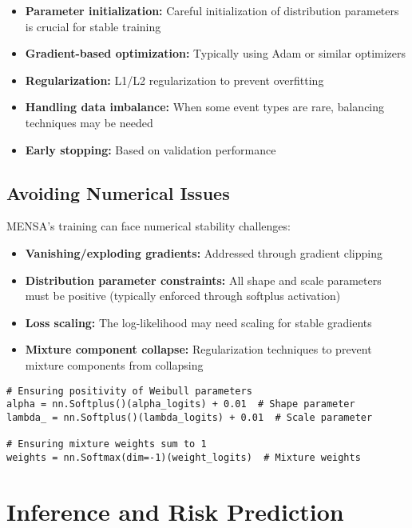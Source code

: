 \begin{itemize}
    \item \textbf{Parameter initialization:} Careful initialization of distribution parameters is crucial for stable training
    \item \textbf{Gradient-based optimization:} Typically using Adam or similar optimizers
    \item \textbf{Regularization:} L1/L2 regularization to prevent overfitting
    \item \textbf{Handling data imbalance:} When some event types are rare, balancing techniques may be needed
    \item \textbf{Early stopping:} Based on validation performance
\end{itemize}

\subsection{Avoiding Numerical Issues}

MENSA's training can face numerical stability challenges:

\begin{itemize}
    \item \textbf{Vanishing/exploding gradients:} Addressed through gradient clipping
    \item \textbf{Distribution parameter constraints:} All shape and scale parameters must be positive (typically enforced through softplus activation)
    \item \textbf{Loss scaling:} The log-likelihood may need scaling for stable gradients
    \item \textbf{Mixture component collapse:} Regularization techniques to prevent mixture components from collapsing
\end{itemize}

\begin{examplebox}[title=Code Example: MENSA Parameter Constraints]
\begin{verbatim}
# Ensuring positivity of Weibull parameters
alpha = nn.Softplus()(alpha_logits) + 0.01  # Shape parameter
lambda_ = nn.Softplus()(lambda_logits) + 0.01  # Scale parameter

# Ensuring mixture weights sum to 1
weights = nn.Softmax(dim=-1)(weight_logits)  # Mixture weights
\end{verbatim}
\end{examplebox}

\section{Inference and Risk Prediction}

